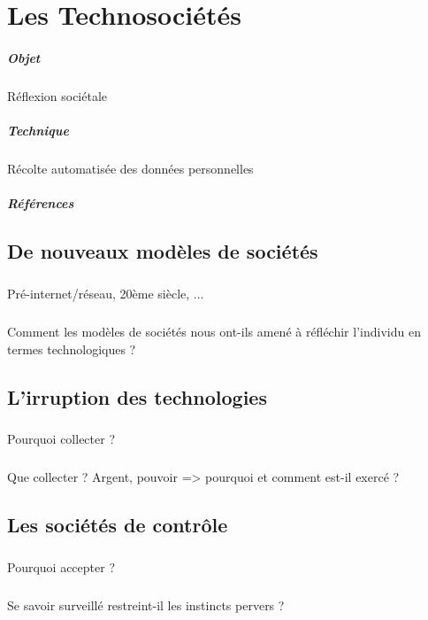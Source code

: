\chapter{Les Technosociétés}
\paragraph{Objet} Réflexion sociétale
\paragraph{Technique} Récolte automatisée des données personnelles
\paragraph{Références}
\cite{Damasio:0}
\cite{Damasio:1}
\cite{Deleuze:0}
\cite{Foucault:0}
\cite{Huxley:0}
\cite{Klein:0}
\cite{Marx:0}
\cite{Marx:1}
\cite{Moore:0}
\cite{Negri:0}
\cite{Nietzsche:0}
\cite{Orwell:0}
\cite{Pieces:0}
\cite{Rabhi:0}
\cite{GhostInTheShell}
\cite{Gunnm}
\cite{PsychoPass}

\section{De nouveaux modèles de sociétés}
\paragraph{} Pré-internet/réseau, 20ème siècle, ...
\paragraph{} Comment les modèles de sociétés nous ont-ils amené à réfléchir l'individu en termes technologiques ?

\section{L'irruption des technologies}
\paragraph{} Pourquoi collecter ?
\paragraph{} Que collecter ? Argent, pouvoir => pourquoi et comment est-il exercé ? 

\section{Les sociétés de contrôle}
\paragraph{} Pourquoi accepter ?
\paragraph{} Se savoir surveillé restreint-il les instincts pervers ?